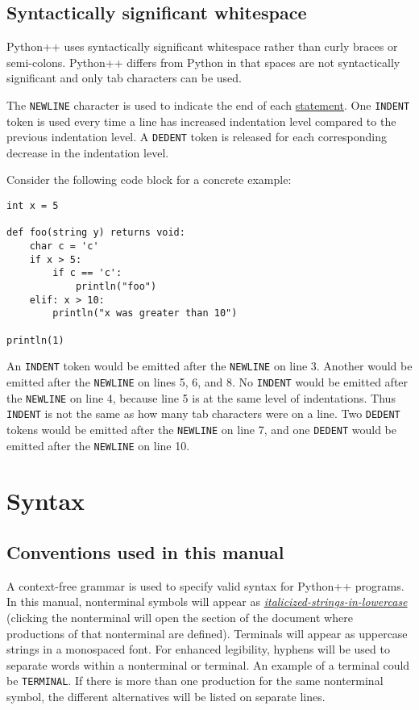 \documentclass{article}
\begin{document}
\subsection{Syntactically significant whitespace}
Python++ uses syntactically significant whitespace rather than curly braces or semi-colons. Python++ differs from Python in that spaces are not syntactically significant and only tab characters can be used.

The \texttt{NEWLINE} character is used to indicate the end of each \hyperref[sec:stmt]{statement}. One \texttt{INDENT} token is used every time a line has increased indentation level compared to the previous indentation level. A \texttt{DEDENT} token is released for each corresponding decrease in the indentation level. 

Consider the following code block for a concrete example:
\begin{verbatim}
int x = 5

def foo(string y) returns void:
    char c = 'c'
    if x > 5:
        if c == 'c':
            println("foo")
    elif: x > 10:
        println("x was greater than 10")
        
println(1)

\end{verbatim}
An \texttt{INDENT} token would be emitted after the \texttt{NEWLINE} on line 3. Another would be emitted after the \texttt{NEWLINE} on lines 5, 6, and 8. No \texttt{INDENT} would be emitted after the \texttt{NEWLINE} on line 4, because line 5 is at the same level of indentations. Thus \texttt{INDENT} is not the same as how many tab characters were on a line. Two \texttt{DEDENT} tokens would be emitted after the \texttt{NEWLINE} on line 7, and one \texttt{DEDENT} would be emitted after the \texttt{NEWLINE} on line 10.

\section{Syntax}
\subsection{Conventions used in this manual}
\label{sec:italicized-strings-in-lowercase}
\label{sec:bar}
A context-free grammar is used to specify valid syntax for Python++ programs. In this manual, nonterminal symbols will appear as \hyperref[sec:italicized-strings-in-lowercase]{\textit{italicized-strings-in-lowercase}} (clicking the nonterminal will open the section of the document where productions of that nonterminal are defined). Terminals will appear as uppercase strings in a monospaced font. For enhanced legibility, hyphens will be used to separate words within a nonterminal or terminal. An example of a terminal could be  \texttt{TERMINAL}. If there is more than one production for the same nonterminal symbol, the different alternatives will be listed on separate lines.
\end{document}
